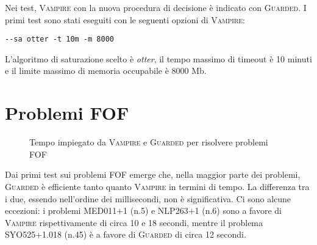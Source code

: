 \begin{table}[H]
    \caption{Numerazione dei problemi CNF}
        
\end{table}
Nei test, \textsc{Vampire} con la nuova procedura di decisione è indicato con \textsc{Guarded}.
I primi test sono stati eseguiti con le seguenti opzioni di \textsc{Vampire}:
\begin{center}
    \verb|--sa otter -t 10m -m 8000|    
\end{center}
L'algoritmo di saturazione scelto è \emph{otter}, il tempo massimo di timeout è 10 minuti 
e il limite massimo di memoria occupabile è 8000 Mb.
\section{Problemi FOF}
\begin{figure}[H]
    \centering
    \caption{Tempo impiegato da \textsc{Vampire} e \textsc{Guarded} per risolvere problemi FOF}
\end{figure}
Dai primi test sui problemi FOF emerge che, nella maggior parte dei problemi, \textsc{Guarded} è efficiente
tanto quanto \textsc{Vampire} in termini di tempo. La differenza tra i due, essendo nell'ordine dei millisecondi,
non è significativa. 
Ci sono alcune eccezioni: i problemi MED011+1 (n.5) e NLP263+1 (n.6) sono a favore di
\textsc{Vampire} rispettivamente di circa 10 e 18 secondi, mentre il problema SYO525+1.018 (n.45) è a favore di \textsc{Guarded} di circa 12 secondi.

